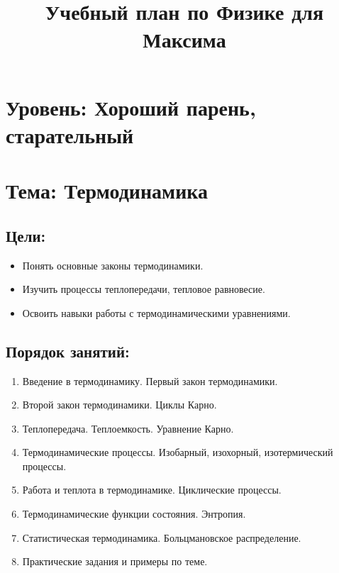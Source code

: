 \documentclass{article}
\begin{document}
\title{Учебный план по Физике для Максима}
\author{}
\date{}
\maketitle

\section*{Уровень: Хороший парень, старательный}

\section{Тема: Термодинамика}

\subsection{Цели:}
\begin{itemize}[noitemsep]
    \item Понять основные законы термодинамики.
    \item Изучить процессы теплопередачи, тепловое равновесие.
    \item Освоить навыки работы с термодинамическими уравнениями.
\end{itemize}

\subsection{Порядок занятий:}
\begin{enumerate}[noitemsep]
    \item Введение в термодинамику. Первый закон термодинамики.
    \item Второй закон термодинамики. Циклы Карно.
    \item Теплопередача. Теплоемкость. Уравнение Карно.
    \item Термодинамические процессы. Изобарный, изохорный, изотермический процессы.
    \item Работа и теплота в термодинамике. Циклические процессы.
    \item Термодинамические функции состояния. Энтропия.
    \item Статистическая термодинамика. Больцмановское распределение.
    \item Практические задания и примеры по теме.
\end{enumerate}
\end{document}
